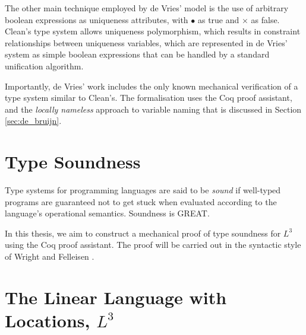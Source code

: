 \documentclass[]{unswthesis}
\let\i\textit
\begin{document}
The other main technique employed by de Vries' model is the use of arbitrary boolean expressions as uniqueness attributes, with $\bullet$ as true and $\times$ as false. Clean's type system allows uniqueness polymorphism, which results in constraint relationships between uniqueness variables, which are represented in de Vries' system as simple boolean expressions that can be handled by a standard unification algorithm.

Importantly, de Vries' work includes the only known mechanical verification of a type system similar to Clean's. The formalisation uses the Coq proof assistant, and the \i{locally nameless} approach to variable naming that is discussed in Section \ref{sec:de_bruijn}.




\section{Type Soundness}

Type systems for programming languages are said to be \i{sound} if well-typed programs are guaranteed not to get stuck when evaluated according to the language's operational semantics. Soundness is GREAT.

In this thesis, we aim to construct a mechanical proof of type soundness for $L^3$ using the Coq proof assistant. The proof will be carried out in the syntactic style of Wright and Felleisen \cite{wright94}.

\section{The Linear Language with Locations, $L^3$}

\end{document}
